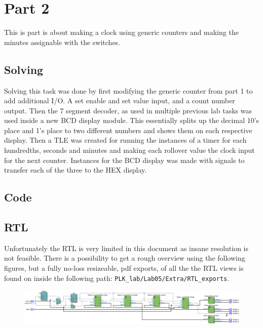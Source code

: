 \documentclass{article}
\begin{document}
\section{Part 2}
This is part is about making a clock using generic counters and making the minutes assignable with the switches. 


\subsection{Solving}
Solving this task was done by first modifying the generic counter from part 1 to add additional I/O. A set enable and set value input, and a count number output. Then the 7 segment decoder, as used in multiple previous lab tasks was used inside a new BCD display module. This essentially splits up the decimal 10's place and 1's place to two different numbers and shows them on each respective display. Then a TLE was created for running the instances of a timer for each hundredths, seconds and minutes and making each rollover value the clock input for the next counter. Instances for the BCD display was made with signals to transfer each of the three to the HEX display.

\clearpage
\subsection{Code}

\clearpage
{}

\clearpage
\subsection{RTL}
Unfortunately the RTL is very limited in this document as insane resolution is not feasible. There is a possibility to get a rough overview using the following figures, but a fully  no-loss resizeable,  pdf exports, of all the the RTL views is found on  inside the following path: \verb|PLK_lab/Lab05/Extra/RTL_exports|.

\hfill

\begin{figure}[h]
    \centering
    \includegraphics[width=1\textwidth]{Figures/Part2_RTL_TLE.jpg}
    \label{fig:p2_RTL_TLE}
\end{figure}
\end{document}
